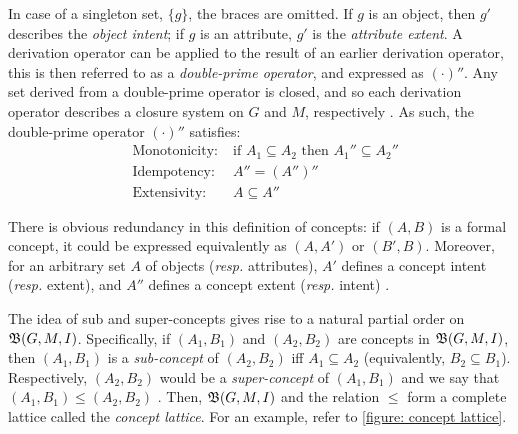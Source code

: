 %
In case of a singleton set, $\{g\}$, the braces are omitted. If $g$ is an object, then $g'$ describes the \emph{object intent}; if $g$ is an attribute, $g'$ is the \emph{attribute extent}. A derivation operator can be applied to the result of an earlier derivation operator, this is then referred to as a \emph{double-prime operator}, and expressed as $(\cdot)''$.
Any set derived from a double-prime operator is closed, and so each derivation operator describes a closure system on $G$ and $M$, respectively \cite{ganter1999formal,ganter2016conceptual,rudolph2007relational}. As such, the double-prime operator $(\cdot)''$ satisfies:
%
\[
    \begin{aligned}
         & \text{Monotonicity:} & \; \text{if } A_1 \subseteq A_2 \text{ then } A_1'' \subseteq A_2'' \\
         & \text{Idempotency:}  & \; A'' = (A'')''                                                    \\
         & \text{Extensivity:}  & \; A \subseteq A''
    \end{aligned}
\]
%
%
There is obvious redundancy in this definition of concepts: if $(A,B)$ is a formal concept, it could be expressed equivalently as $(A,A')$ or $(B',B)$. Moreover, for an arbitrary set $A$ of objects (\textit{resp.} attributes), $A'$ defines a concept intent (\textit{resp.} extent), and $A''$ defines a concept extent (\textit{resp.} intent) \cite{ganter2016conceptual}.
%
%
The idea of sub and super-concepts gives rise to a natural partial order on $\mathfrak{B}(G,M,I)$. Specifically, if $(A_1,B_1)$ and $(A_2,B_2)$ are concepts in $\mathfrak{B}(G,M,I)$, then $(A_1,B_1)$ is a \emph{sub-concept} of $(A_2,B_2)$ iff $A_1 \subseteq A_2$ (equivalently, $B_2 \subseteq B_1$). Respectively, $(A_2,B_2)$ would be a \emph{super-concept} of $(A_1,B_1)$ and we say that $(A_1,B_1) \leq (A_2,B_2)$ \cite{ganter1999formal}. Then, $\mathfrak{B}(G,M,I)$ and the relation $\leq$ form a complete lattice called the \emph{concept lattice}. For an example, refer to \cref{figure: concept lattice}.

